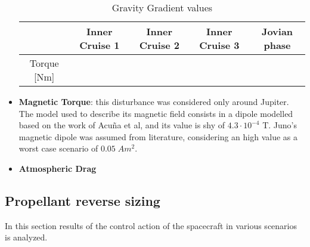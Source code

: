 \begin{itemize}
    \begin{table}[H]
        \renewcommand{\arraystretch}{1.3}
        \centering
        \begin{tabular}{|c|c|c|c|c|}
            \hline
            &\textbf{Inner Cruise 1} & \textbf{Inner Cruise 2} & \textbf{Inner Cruise 3} & \textbf{Jovian phase} \\
            \hline
            \hline
             Torque [Nm] & & & & \\
            \hline
        \end{tabular}
        \caption{Gravity Gradient values}
        \label{table:GGG}
    \end{table}
    
    \item \textbf{Magnetic Torque}: this disturbance was considered only around Jupiter. The model used to describe its magnetic field consists in a dipole modelled based on the work of Acuña et al\cite{jupiter_mag_field}, and its value is shy of $4.3\cdot 10^{-4}$ T. Juno's magnetic dipole was assumed from literature, considering an high value as a worst case scenario of $0.05 \; Am^2$.
    
    \item \textbf{Atmospheric Drag}
    
        
\end{itemize}

\subsection{Propellant reverse sizing}
\label{subsec:prop_rev_sizing}

In this section results of the control action of the spacecraft in various scenarios is analyzed.

